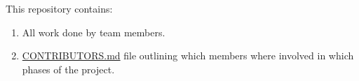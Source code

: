 \documentclass[a4paper,10pt]{article}
\begin{document}
This repository contains:
\begin{enumerate}
\item All work done by team members.
\item \href{https://github.com/josephbondjobo/COS301-Maroon-Team/blob/develop/Intro/Contributors.md}{CONTRIBUTORS.md} file outlining which members where involved in which phases of the project.
\end{enumerate}



\newpage
\clearpage
{}
\end{document}
